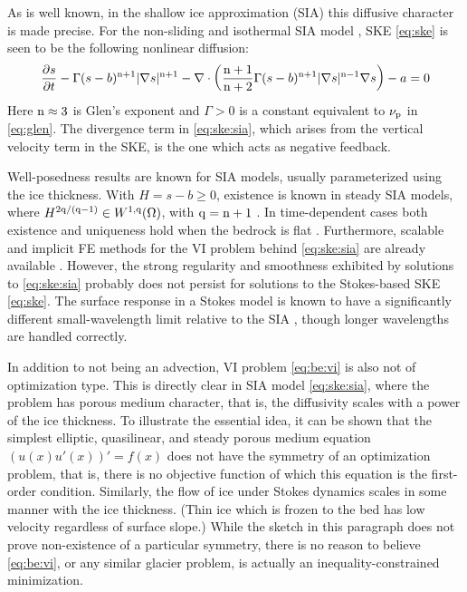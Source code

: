 \documentclass[hidelinks,onefignum,onetabnum,final]{siamart220329}  %
\newcommand{\grad}{\nabla}
\newcommand{\Div}{\nabla\cdot}
\newcommand{\nn}{{\text{\textnormal{n}}}}
\newcommand{\pp}{{\text{\textnormal{p}}}}
\newcommand{\qq}{{\text{\textnormal{q}}}}
\begin{document}
As is well known, in the shallow ice approximation (SIA) this diffusive character is made precise.  For the non-sliding and isothermal SIA model \cite{GreveBlatter2009,JouvetBueler2012}, SKE \eqref{eq:ske} is seen to be the following nonlinear diffusion:
\begin{equation}
\frac{\partial s}{\partial t} - \Gamma (s-b)^{\nn+1} |\grad s|^{\nn+1} - \Div \left(\frac{\nn+1}{\nn+2} \Gamma (s-b)^{\nn+1} |\grad s|^{\nn-1} \grad s\right) - a = 0  \label{eq:ske:sia}
\end{equation}
Here $\nn\approx 3$ is Glen's exponent \cite{GreveBlatter2009} and $\Gamma>0$ is a constant equivalent to $\nu_\pp$ in \eqref{eq:glen}.  The divergence term in \eqref{eq:ske:sia}, which arises from the vertical velocity term in the SKE, is the one which acts as negative feedback.

Well-posedness results are known for SIA models, usually parameterized using the ice thickness.  With $H=s-b \ge 0$, existence is known in steady SIA models, where $H^{2\qq/(\qq-1)} \in W^{1,\qq}(\Omega)$, with $\qq=\nn+1$ \cite{JouvetBueler2012}.  In time-dependent cases both existence and uniqueness hold when the bedrock is flat \cite{Calvoetal2003,PiersantiTemam2023}.  Furthermore, scalable and implicit FE methods for the VI problem behind \eqref{eq:ske:sia} are already available \cite[Example 8.4]{BuelerFarrell2024}.  However, the strong regularity and smoothness exhibited by solutions to \eqref{eq:ske:sia} probably does not persist for solutions to the Stokes-based SKE \eqref{eq:ske}.  The surface response in a Stokes model is known to have a significantly different small-wavelength limit relative to the SIA \cite{Pattynetal2008}, though longer wavelengths are handled correctly.

In addition to not being an advection, VI problem \eqref{eq:be:vi} is also not of optimization type.  This is directly clear in SIA model \eqref{eq:ske:sia}, where the problem has porous medium character, that is, the diffusivity scales with a power of the ice thickness.  To illustrate the essential idea, it can be shown that the simplest elliptic, quasilinear, and steady porous medium equation $(u(x) u'(x))' = f(x)$ does not have the symmetry of an optimization problem, that is, there is no objective function of which this equation is the first-order condition.  Similarly, the flow of ice under Stokes dynamics scales in some manner with the ice thickness.  (Thin ice which is frozen to the bed has low velocity regardless of surface slope.)  While the sketch in this paragraph does not prove non-existence of a particular symmetry, there is no reason to believe \eqref{eq:be:vi}, or any similar glacier problem, is actually an inequality-constrained minimization.
\end{document}
